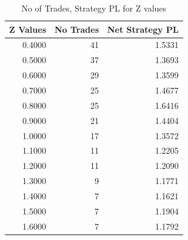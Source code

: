\begin{table}[!ht] 
\centering 
\resizebox{0.4\textwidth}{!} { 
\begin{tabular}{rrr}
\toprule
Z Values & No Trades & Net Strategy PL \\
\midrule
0.4000 & 41 & 1.5331 \\
0.5000 & 37 & 1.3693 \\
0.6000 & 29 & 1.3599 \\
0.7000 & 25 & 1.4677 \\
0.8000 & 25 & 1.6416 \\
0.9000 & 21 & 1.4404 \\
1.0000 & 17 & 1.3572 \\
1.1000 & 11 & 1.2205 \\
1.2000 & 11 & 1.2090 \\
1.3000 & 9 & 1.1771 \\
1.4000 & 7 & 1.1621 \\
1.5000 & 7 & 1.1904 \\
1.6000 & 7 & 1.1792 \\
\bottomrule
\end{tabular}} 
\caption {No of Trades, Strategy PL for Z values} 
\label {z_values} 
\end{table} 
\FloatBarrier